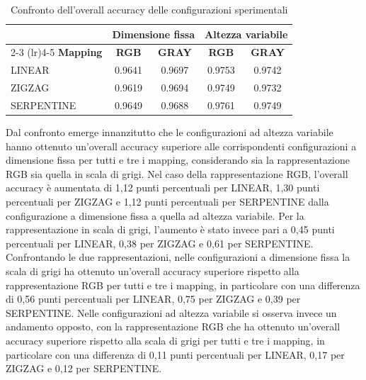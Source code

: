 \begin{table}[H]
    \centering
    \caption{Confronto dell'overall accuracy delle configurazioni
    sperimentali}
    \label{tab:confronto_accuracy}
    \renewcommand{\arraystretch}{1.3}
    \begin{tabular}{lcccc}
        \toprule
        & \multicolumn{2}{c}{\textbf{Dimensione fissa}}
        & \multicolumn{2}{c}{\textbf{Altezza variabile}} \\
        \cmidrule(lr){2-3}
        \cmidrule(lr){4-5}
        \textbf{Mapping}
        & \textbf{RGB} & \textbf{GRAY}
        & \textbf{RGB} & \textbf{GRAY} \\
        \midrule
        LINEAR     & 0.9641 & 0.9697 & 0.9753 & 0.9742 \\
        ZIGZAG     & 0.9619 & 0.9694 & 0.9749 & 0.9732 \\
        SERPENTINE & 0.9649 & 0.9688 & 0.9761 & 0.9749 \\
        \bottomrule
    \end{tabular}
\end{table}

Dal confronto emerge innanzitutto che le configurazioni ad altezza
variabile hanno ottenuto un'overall accuracy superiore alle
corrispondenti configurazioni a dimensione fissa per tutti e tre i
mapping, considerando sia la rappresentazione RGB sia quella in
scala di grigi.
Nel caso della rappresentazione RGB, l'overall accuracy è aumentata
di 1,12 punti percentuali per LINEAR, 1,30 punti percentuali per
ZIGZAG e 1,12 punti percentuali per SERPENTINE dalla configurazione
a dimensione fissa a quella ad altezza variabile. Per la
rappresentazione in scala di grigi, l'aumento è stato invece pari a
0,45 punti percentuali per LINEAR, 0,38 per ZIGZAG e 0,61 per
SERPENTINE.
Confrontando le due rappresentazioni, nelle configurazioni a
dimensione fissa la scala di grigi ha ottenuto un'overall accuracy
superiore rispetto alla rappresentazione RGB per tutti e tre i
mapping, in particolare con una differenza di 0,56 punti percentuali
per LINEAR, 0,75 per ZIGZAG e 0,39 per SERPENTINE.
Nelle configurazioni ad altezza variabile si osserva invece un
andamento opposto, con la rappresentazione RGB che ha ottenuto
un'overall accuracy superiore rispetto alla scala di grigi per tutti
e tre i mapping, in particolare con una differenza di 0,11 punti
percentuali per LINEAR, 0,17 per ZIGZAG e 0,12 per SERPENTINE.

